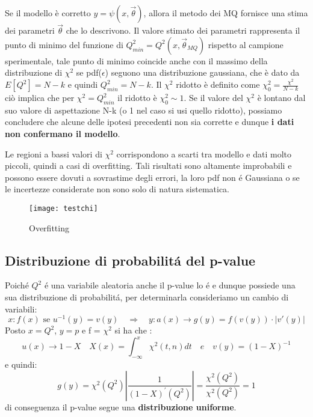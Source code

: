 Se il modello \`{e} corretto $y = \psi(x,\vec{\theta})$, allora il metodo dei MQ fornisce una stima dei parametri $\vec{\theta}$ che lo descrivono. Il valore stimato dei parametri rappresenta il punto di minimo del funzione di $Q^2_{min} = Q^2(x,\vec{\theta}_{MQ})$ rispetto al campione sperimentale, tale punto di minimo coincide anche con il massimo della distribuzione di $\chi^2$ se pdf($\epsilon$) seguono una distribuzione gaussiana, che \`{e} dato da $E[Q^2] = N-k$ e quindi $Q^2_{min} = N-k$. \newline
Il $\chi^2$ ridotto \`{e} definito come $\chi^2_{0} = \frac{\chi^2}{N-k}$ ci\`{o} implica che per $\chi^2 = Q^2_{min}$ il ridotto \`{e} $\chi^2_0 \sim 1$. \newline
Se il valore del $\chi^2$ \`{e} lontano dal suo valore di aspettazione N-k (o 1 nel caso si usi quello ridotto), possiamo concludere che alcune delle ipotesi precedenti non sia corrette e dunque \textbf{i dati non confermano il modello}. 

\noindent Le regioni a bassi valori di $\chi^2$ corrispondono a scarti tra modello e dati molto piccoli, quindi a casi di overfitting. Tali risultati sono altamente improbabili e possono essere dovuti a sovrastime degli errori, la loro pdf non \'{e} Gaussiana o se le incertezze considerate non sono solo di natura sistematica. 

\begin{figure}[ht]
\vspace{0.1in}
\texttt{[image: testchi]}	
\centering
\caption{Overfitting}
\end{figure}

\subsection{Distribuzione di probabilit\'{a} del p-value}
Poich\'{e} $Q^2$ \'{e} una variabile aleatoria anche il p-value lo \'{e} e dunque possiede una sua distribuzione di probabilit\'{a}, per determinarla consideriamo un cambio di variabili:
\begin{equation*}
	x: f(x) \text { se } u^{-1}(y)=v(y) \quad \Rightarrow \quad y: a(x) \rightarrow g(y)=f(v(y)) \cdot\left|v'(y)\right|
\end{equation*}
Posto $x = Q^2$, $y=p$ e f = $\chi^2$ si ha che :
\begin{equation*}
	u(x) \rightarrow 1-X \quad X(x)=\int_{-\infty}^{x} \chi^2(t, n) d t \quad e \quad v(y)=(1-X)^{-1}
\end{equation*}
e quindi:
\begin{equation*}
	g(y)=\chi^2\left(Q^2\right)\left|\frac{1}{(1-X)^{\prime}\left(Q^2\right)}\right|=\frac{\chi^2\left(Q^2\right)}{\chi^2\left(Q^2\right)}=1
\end{equation*}
\newline
\noindent di conseguenza  il p-value segue una \textbf{distribuzione uniforme}. 
\newline

